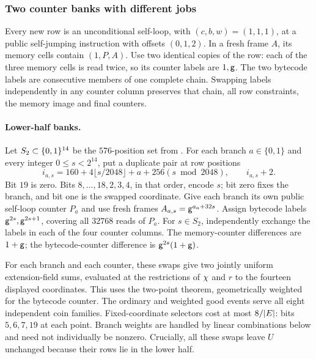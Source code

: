 \subsubsection{Two counter banks with different jobs}

Every new row is an unconditional self-loop, with $(c,b,w)=(1,1,1)$, at a public self-jumping instruction with offsets $(0,1,2)$. In a fresh frame $A$, its memory cells contain $(1,P,A)$. Use two identical copies of the row: each of the three memory cells is read twice, so its counter labels are $1,\mathsf{g}$. The two bytecode labels are consecutive members of one complete chain. Swapping labels independently in any counter column preserves that chain, all row constraints, the memory image and final counters.

\paragraph{Lower-half banks.} Let $S_2\subset\{0,1\}^{14}$ be the $576$-position set from . For each branch $a\in\{0,1\}$ and every integer $0\le s<2^{14}$, put a duplicate pair at row positions
\[
 i_{a,s}=160+4\lfloor s/2048\rfloor+a+256(s\bmod2048),
 \qquad i_{a,s}+2.
\]
Bit $19$ is zero. Bits $8,\ldots,18,2,3,4$, in that order, encode $s$; bit zero fixes the branch, and bit one is the swapped coordinate. Give each branch its own public self-loop counter $P_a$ and use fresh frames $A_{a,s}=\mathsf{g}^{a_a+32s}$. Assign bytecode labels $\mathsf{g}^{2s},\mathsf{g}^{2s+1}$, covering all $32768$ reads of $P_a$. For $s\in S_2$, independently exchange the labels in each of the four counter columns. The memory-counter differences are $1+\mathsf{g}$; the bytecode-counter difference is $\mathsf{g}^{2s}(1+\mathsf{g})$.

For each branch and each counter, these swaps give two jointly uniform extension-field sums, evaluated at the restrictions of $\chi$ and $r$ to the fourteen displayed coordinates. This uses the two-point theorem, geometrically weighted for the bytecode counter. The ordinary and weighted good events serve all eight independent coin families. Fixed-coordinate selectors cost at most $8/|E|$: bits $5,6,7,19$ at each point. Branch weights are handled by linear combinations below and need not individually be nonzero. Crucially, all these swaps leave $U$ unchanged because their rows lie in the lower half.

